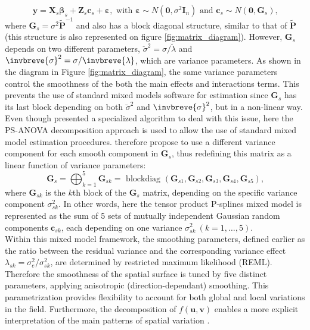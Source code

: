 \[
    \boldsymbol{y}=\boldsymbol{X}_{s} \boldsymbol{\beta}_{s}+\boldsymbol{Z}_{s} \boldsymbol{c}_{s}+\boldsymbol{\varepsilon}, 	
    \text { with } 
    \boldsymbol{\varepsilon} \sim N\left(\mathbf{0}, \sigma^{2} \boldsymbol{I}_{n}\right) 
    \text { and } 
    \boldsymbol{c}_{s} \sim N\left(\mathbf{0}, \boldsymbol{G}_{s}\right)
    \text{,}
\]
where $\boldsymbol{G}_{s} = \sigma^2\widetilde{\boldsymbol{P}}^{-1}$ and also has a block diagonal structure, similar to that of $\widetilde{\boldsymbol{P}}$ (this structure is also represented on 
figure \ref{fig:matrix_diagram}). 
However, $\boldsymbol{G}_{s}$ depends on two different parameters, $\breve{\sigma}^2 =\sigma / \breve{\lambda}$ and $
\invbreve{\sigma}^2 =\sigma / \invbreve{\lambda}$, which are variance parameters. 
As shown in the diagram in Figure \ref{fig:matrix_diagram}, the same variance parameters control the smoothness of the both the 
main effects and interactions terms. 
This prevents the use of standard mixed models software for estimation since $\mathbf{G}_s$ has its last block depending on both 
$\breve{\sigma}^2$ and $\invbreve{\sigma}^2$, but in a non-linear way. 
Even though \textcite{rodriguez-alvarez_fast_2015} presented a specialized algorithm to deal with this issue, 
here the PS-ANOVA decomposition approach \parencite{lee_efficient_2013} is used to allow the use of standard mixed model estimation procedures. \textcite{lee_efficient_2013} therefore propose to use a different variance component for each smooth component in $\mathbf{G}_s$, thus redefining this matrix as a linear function of variance parameters:
\[
    \boldsymbol{G}_{s} = 
    \bigoplus_{k=1}^{5} \boldsymbol{G}_{s k}= 
    \text{ blockdiag }
    \left(\boldsymbol{G}_{s 1}, \boldsymbol{G}_{s 2}, \boldsymbol{G}_{s 3}, \boldsymbol{G}_{s 4}, \boldsymbol{G}_{s 5}\right)
    \text{,}
\]
where $\boldsymbol{G}_{s k}$ %
is the $k$th block of the $\mathbf{G}_{s}$ matrix, depending on the specific variance component $\sigma_{sk}^2$. 
In other words, here the tensor product P-splines mixed model is represented as the sum of 5 sets of mutually independent Gaussian random components $\mathbf{c}_{sk}$, each depending on one variance $\sigma_{sk}^2 \ (k=1,\ldots,5)$.\\

Within this mixed model framework, the smoothing parameters, defined earlier as the ratio between the residual variance and the
corresponding variance effect $\lambda_{sk} = \sigma^2_{e} / \sigma^2_{sk}$, are determined by restricted maximum likelihood (REML). Therefore the smoothness of the spatial surface is tuned by five distinct parameters, applying anisotropic (direction-dependant) smoothing. This parametrization provides flexibility to account for both global and local variations in the field. Furthermore, the decomposition of $f(\boldsymbol{u},\boldsymbol{v})$ enables a more explicit interpretation of the main patterns of spatial variation \parencite{rodriguez-alvarez_correcting_2018}.

